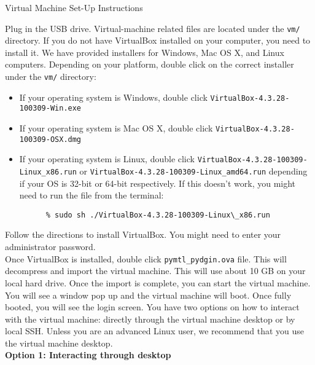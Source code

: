\documentclass[11pt]{article}
\begin{document}
\pagestyle{empty}

\begin{center}
{\Large Virtual Machine Set-Up Instructions}
\end{center}

Plug in the USB drive. Virtual-machine related files are located under the
\texttt{vm/} directory. If you do not have VirtualBox installed on your
computer, you need to install it. We have provided installers for Windows,
Mac OS X, and Linux computers. Depending on your platform, double click on
the correct installer under the \texttt{vm/} directory:

\begin{itemize}
  \item If your operating system is Windows, double click
  \texttt{VirtualBox-4.3.28-100309-Win.exe}
  \item If your operating system is Mac OS X, double click
  \texttt{VirtualBox-4.3.28-100309-OSX.dmg}
  \item If your operating system is Linux, double click
    \texttt{VirtualBox-4.3.28-100309-Linux\_x86.run} or 
    \texttt{VirtualBox-4.3.28-100309-Linux\_amd64.run} depending if your OS is
    32-bit or 64-bit respectively. If this doesn't work, you might need to
    run the file from the terminal:
    \begin{verbatim}
      % sudo sh ./VirtualBox-4.3.28-100309-Linux\_x86.run
    \end{verbatim}
\end{itemize}

Follow the directions to install VirtualBox. You might need to enter your
administrator password.\\

Once VirtualBox is installed, double click \texttt{pymtl\_pydgin.ova}
file. This will decompress and import the virtual machine. This will use
about 10 GB on your local hard drive. Once the import is complete, you can
start the virtual machine.\\

You will see a window pop up and the virtual machine will boot. Once fully
booted, you will see the login screen. You have two options on how to
interact with the virtual machine: directly through the virtual machine
desktop or by local SSH. Unless you are an advanced Linux user, we
recommend that you use the virtual machine desktop.\\

{\large \textbf{Option 1: Interacting through desktop}}\\
\end{document}
